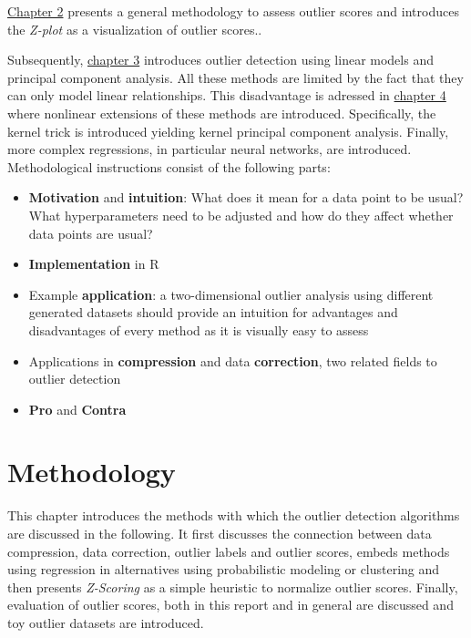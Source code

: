 \documentclass[]{report}
\providecommand{\tightlist}{%
  \setlength{\itemsep}{0pt}\setlength{\parskip}{0pt}}
\theoremstyle{definition}
\theoremstyle{definition}
\theoremstyle{definition}
\theoremstyle{remark}
\begin{document}
\protect\hyperlink{methods}{Chapter 2} presents a general methodology to
assess outlier scores and introduces the \emph{Z-plot} as a
visualization of outlier scores..

Subsequently, \protect\hyperlink{linear}{chapter 3} introduces outlier
detection using linear models and principal component analysis. All
these methods are limited by the fact that they can only model linear
relationships. This disadvantage is adressed in
\protect\hyperlink{nonlinear}{chapter 4} where nonlinear extensions of
these methods are introduced. Specifically, the kernel trick is
introduced yielding kernel principal component analysis. Finally, more
complex regressions, in particular neural networks, are introduced.
Methodological instructions consist of the following parts:

\begin{itemize}
\tightlist
\item
  \textbf{Motivation} and \textbf{intuition}: What does it mean for a
  data point to be usual? What hyperparameters need to be adjusted and
  how do they affect whether data points are usual?
\item
  \textbf{Implementation} in R
\item
  Example \textbf{application}: a two-dimensional outlier analysis using
  different generated datasets should provide an intuition for
  advantages and disadvantages of every method as it is visually easy to
  assess
\item
  Applications in \textbf{compression} and data \textbf{correction}, two
  related fields to outlier detection
\item
  \textbf{Pro} and \textbf{Contra}
\end{itemize}

\hypertarget{methodology}{%
\chapter{Methodology}\label{methodology}}

This chapter introduces the methods with which the outlier detection
algorithms are discussed in the following. It first discusses the
connection between data compression, data correction, outlier labels and
outlier scores, embeds methods using regression in alternatives using
probabilistic modeling or clustering and then presents \emph{Z-Scoring}
as a simple heuristic to normalize outlier scores. Finally, evaluation
of outlier scores, both in this report and in general are discussed and
toy outlier datasets are introduced.
\end{document}

